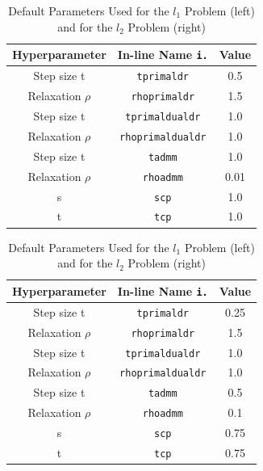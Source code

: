 \documentclass{article}
\theoremstyle{definition}
\theoremstyle{remark}
\begin{document}
\begin{table}[h!]
    \caption{Default Parameters Used for the $l_1$ Problem (left) and for the $l_2$ Problem (right)}
    \vspace{7pt} %
    \renewcommand{\arraystretch}{1.5}
    \begin{tabular}{|c|c|c|}
        \hline
        \textbf{Hyperparameter} & \textbf{In-line Name \texttt{i.}} & \textbf{Value} \\
        \hline
        Step size t & \texttt{tprimaldr} & 0.5 \\
        \hline
        Relaxation $\rho$ & \texttt{rhoprimaldr} & 1.5 \\
        \hline
        Step size t & \texttt{tprimaldualdr} & 1.0 \\
        \hline
        Relaxation $\rho$ & \texttt{rhoprimaldualdr} & 1.0 \\
        \hline
        Step size t & \texttt{tadmm} & 1.0 \\
        \hline
        Relaxation $\rho$ & \texttt{rhoadmm} & 0.01 \\
        \hline
        s & \texttt{scp} & 1.0 \\
        \hline
        t & \texttt{tcp} & 1.0 \\
        \hline
    \end{tabular}
    \quad
    \begin{tabular}{|c|c|c|}
        \hline
        \textbf{Hyperparameter} & \textbf{In-line Name \texttt{i.}} & \textbf{Value} \\
        \hline
        Step size t & \texttt{tprimaldr} & 0.25 \\
        \hline
        Relaxation $\rho$ & \texttt{rhoprimaldr} & 1.5 \\
        \hline
        Step size t & \texttt{tprimaldualdr} & 1.0 \\
        \hline
        Relaxation $\rho$ & \texttt{rhoprimaldualdr} & 1.0 \\
        \hline
        Step size t & \texttt{tadmm} &  0.5 \\
        \hline
        Relaxation $\rho$ & \texttt{rhoadmm} & 0.1\\
        \hline
        s & \texttt{scp} & 0.75\\
        \hline
        t & \texttt{tcp} & 0.75 \\
        \hline
    \end{tabular}
\end{table}
\end{document}
